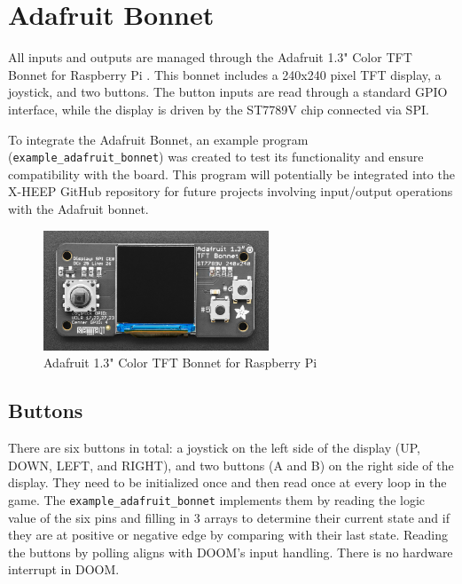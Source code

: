 \section{Adafruit Bonnet}

All inputs and outputs are managed through the Adafruit 1.3" Color TFT Bonnet for Raspberry Pi \cite{adafruitwebsite}. This bonnet includes a 240x240 pixel TFT display, a joystick, and two buttons. The button inputs are read through a standard GPIO interface, while the display is driven by the ST7789V chip connected via SPI.

To integrate the Adafruit Bonnet, an example program (\texttt{example\_adafruit\_bonnet}) \cite{projectRepo} was created to test its functionality and ensure compatibility with the board. This program will potentially be integrated into the X-HEEP GitHub repository for future projects involving input/output operations with the Adafruit bonnet.

\begin{figure}[ht]
    \centering
    \includegraphics[width=0.6\textwidth]{images/Adafruit_Front.jpg}
    \caption{Adafruit 1.3" Color TFT Bonnet for Raspberry Pi \cite{adafruitwebsite}}
    \label{fig:adafruitFront}
\end{figure}


\subsection{Buttons}


There are six buttons in total: a joystick on the left side of the display (UP, DOWN, LEFT, and RIGHT), and two buttons (A and B) on the right side of the display.
They need to be initialized once and then read once at every loop in the game. The \texttt{example\_adafruit\_bonnet} implements them by reading the logic value of the six pins and filling in 3 arrays to determine their current state and if they are at positive or negative edge by comparing with their last state. Reading the buttons by polling aligns with DOOM's input handling. There is no hardware interrupt in DOOM.

